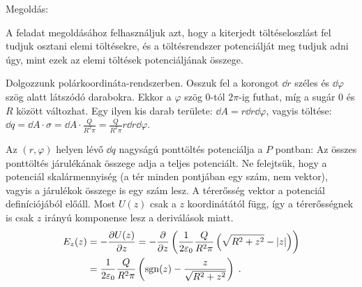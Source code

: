 
\ifdefined\megoldas

 Megoldás: 

 A feladat megoldásához felhasználjuk azt, hogy a kiterjedt töltéseloszlást fel tudjuk osztani elemi töltésekre, és a töltésrendszer potenciálját meg tudjuk adni úgy, mint ezek az elemi töltések potenciáljának összege. 

 Dolgozzunk polárkoordináta-rendszerben. Osszuk fel a korongot $\dd r$ széles és $\dd \varphi$ szög alatt látszódó darabokra. Ekkor a $\varphi$ szög $0$-tól $2\pi$-ig futhat, míg a sugár $0$ és $R$ között változhat. Egy ilyen kis darab területe: $\dd A=r\dd r \dd\varphi$, vagyis töltése: $\dd q=\dd A\cdot \sigma=\dd A\cdot \frac{Q}{R^2\pi}=\frac{Q}{R^2\pi}r\dd r\dd\varphi$. 

 Az $(r,\varphi)$ helyen lévő $\dd q$ nagyságú ponttöltés potenciálja a $P$ pontban:
 Az összes ponttöltés járulékának összege adja a teljes potenciált. Ne felejtsük, hogy a potenciál skalármennyiség (a tér minden pontjában egy szám, nem vektor), vagyis a járulékok összege is egy szám lesz.
 A térerősség vektor a potenciál definíciójából előáll. Most $U(z)$ csak a $z$ koordinátától függ, így a térerősségnek is csak $z$ irányú komponense lesz a deriválások miatt.
 \begin{align}
  {E_z}(z) &= -\frac{\partial U(z)}{\partial z} 
            = -\frac{\partial}{\partial z} \left(\frac{1}{2\varepsilon_0}\frac{Q}{R^2\pi}\left(\sqrt{R^2+z^2}-\left\lvert z\right\rvert\right)\right) \\
           &=  \frac{1}{2\varepsilon_0} \frac{Q}{R^2\pi} \left( \mathop{\mathrm{sgn}}\nolimits(z) - \frac{z}{\sqrt{R^2+z^2}} \right)\;.
 \end{align}

 
\fi